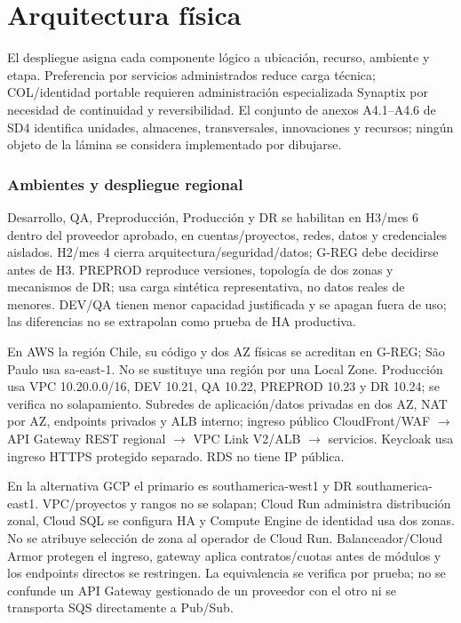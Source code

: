 \documentclass[11pt,letterpaper]{report}
\begin{document}
\section{Arquitectura física}
El despliegue asigna cada componente lógico a ubicación, recurso, ambiente y etapa. Preferencia por servicios administrados reduce carga técnica; COL/identidad portable requieren administración especializada Synaptix por necesidad de continuidad y reversibilidad. El conjunto de anexos A4.1--A4.6 de SD4 identifica unidades, almacenes, transversales, innovaciones y recursos; ningún objeto de la lámina se considera implementado por dibujarse.

\subsubsection*{Ambientes y despliegue regional}
Desarrollo, QA, Preproducción, Producción y DR se habilitan en H3/mes 6 dentro del proveedor aprobado, en cuentas/proyectos, redes, datos y credenciales aislados. H2/mes 4 cierra arquitectura/seguridad/datos; G-REG debe decidirse antes de H3. PREPROD reproduce versiones, topología de dos zonas y mecanismos de DR; usa carga sintética representativa, no datos reales de menores. DEV/QA tienen menor capacidad justificada y se apagan fuera de uso; las diferencias no se extrapolan como prueba de HA productiva.

En AWS la región Chile, su código y dos AZ físicas se acreditan en G-REG; São Paulo usa sa-east-1. No se sustituye una región por una Local Zone. Producción usa VPC 10.20.0.0/16, DEV 10.21, QA 10.22, PREPROD 10.23 y DR 10.24; se verifica no solapamiento. Subredes de aplicación/datos privadas en dos AZ, NAT por AZ, endpoints privados y ALB interno; ingreso público CloudFront/WAF $\rightarrow$ API Gateway REST regional $\rightarrow$ VPC Link V2/ALB $\rightarrow$ servicios. Keycloak usa ingreso HTTPS protegido separado. RDS no tiene IP pública.

En la alternativa GCP el primario es southamerica-west1 y DR southamerica-east1. VPC/proyectos y rangos no se solapan; Cloud Run administra distribución zonal, Cloud SQL se configura HA y Compute Engine de identidad usa dos zonas. No se atribuye selección de zona al operador de Cloud Run. Balanceador/Cloud Armor protegen el ingreso, gateway aplica contratos/cuotas antes de módulos y los endpoints directos se restringen. La equivalencia se verifica por prueba; no se confunde un API Gateway gestionado de un proveedor con el otro ni se transporta SQS directamente a Pub/Sub.
\end{document}
